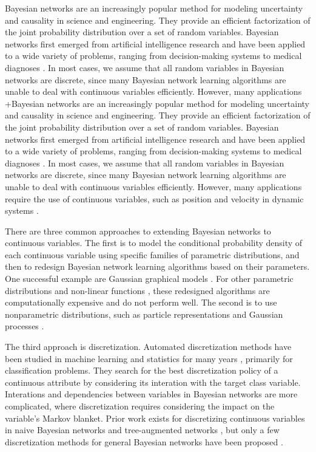 Bayesian networks \citep{Pearl_1988, PGM_2009} are an increasingly popular method for modeling uncertainty and causality in science and engineering.
They provide an efficient factorization of the joint probability distribution over a set of random variables.
Bayesian networks first emerged from artificial intelligence research and have been applied to a wide variety of problems, ranging from decision-making systems \citep{DMU_2015}  to medical diagnoses \citep{Lustgarten_2011}.
In most cases, we assume that all random variables in Bayesian networks are discrete, since many Bayesian network learning algorithms are unable to deal with continuous variables efficiently.
However, many applications   +Bayesian networks \citep{Pearl_1988, PGM_2009} are an increasingly popular method for modeling uncertainty and causality in science and engineering.
They provide an efficient factorization of the joint probability distribution over a set of random variables.
Bayesian networks first emerged from artificial intelligence research and have been applied to a wide variety of problems, ranging from decision-making systems \citep{DMU_2015} to medical diagnoses \citep{Lustgarten_2011}.
In most cases, we assume that all random variables in Bayesian networks are discrete, since many Bayesian network learning algorithms are unable to deal with continuous variables efficiently.
However, many applications require the use of continuous variables, such as position and velocity in dynamic systems \citep{kochenderfer2010airspace}.

There are three common approaches to extending Bayesian networks to continuous variables.
The first is to model the conditional probability density of each continuous variable using specific families of parametric distributions, and then to redesign Bayesian network learning algorithms based on their parameters.
One successful example are Gaussian graphical models \citep{Weiss_2011}.
For other parametric distributions and non-linear functions \citep{Ihler_2009}, these redesigned algorithms are computationally expensive and do not perform well.
The second is to use nonparametric distributions, such as particle representations and Gaussian processes \todo{[cite]}.

The third approach is discretization.
Automated discretization methods have been studied in machine learning and statistics for many years \citep{Dougherty_1995, Kerber_1992, Holte_1993, Fayyad_1993}, primarily for classification problems.
They search for the best discretization policy of a continuous attribute by considering its interation with the target class variable.
Interations and dependencies between variables in Bayesian networks are more complicated, where discretization requires considering the impact on the variable's Markov blanket.
Prior work exists for discretizing continuous variables in naive Bayesian networks and tree-augmented networks \citep{Fried_naive}, but only a few discretization methods for general Bayesian networks have been proposed \citep{Friedman_1996, Kozlov_1997, Monti_1998, Steck_2007}.



